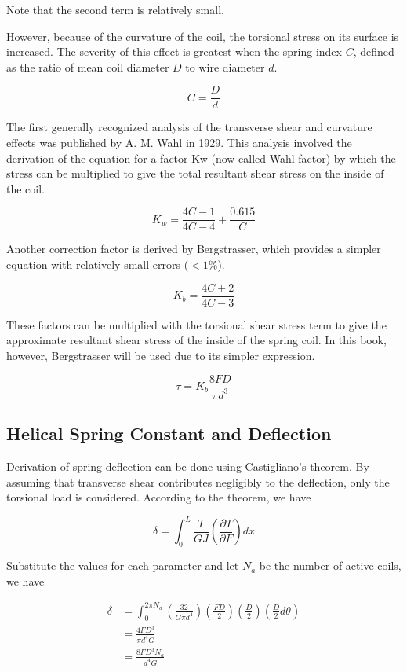 \documentclass[a4paper,openany,12pt]{book}
\begin{document}
{{Note that the second term is relatively small.

However, because of the curvature of the coil, the torsional stress on
its surface is increased. The severity of this effect is greatest when
the spring index \(C\), defined as the ratio of mean coil diameter \(D\) to
wire diameter \(d\).

$$C = \frac{D}{d}$$

The first generally recognized analysis of the transverse shear and
curvature effects was published by A. M. Wahl in 1929. This analysis
involved the derivation of the equation for a factor Kw (now called Wahl
factor) by which the stress can be multiplied to give the total
resultant shear stress on the inside of the coil.

$$K_w = \frac{4C - 1}{4C - 4} + \frac{0.615}{C}$$

Another correction factor is derived by Bergstrasser, which provides a
simpler equation with relatively small errors (\(< 1\%\)).

$$K_b = \frac{4C + 2}{4C - 3}$$

These factors can be multiplied with the torsional shear stress term to
give the approximate resultant shear stress of the inside of the spring
coil. In this book, however, Bergstrasser will be used due to its
simpler expression.

$$\tau  = K_b\frac{8FD}{\pi d^3}$$

\subsection{Helical Spring Constant and Deflection}
\label{helical-spring-constant-and-deflection}
Derivation of spring deflection can be done using Castigliano's theorem.
By assuming that transverse shear contributes negligibly to the
deflection, only the torsional load is considered. According to the
theorem, we have

$$\delta  = \int_0^L \frac{T}{GJ}\left( \frac{\partial T}{\partial F} \right)dx$$

Substitute the values for each parameter and let \(N_a\) be the number of
active coils, we have

$$\begin{aligned}
  \delta  &= \int_0^{2\pi N_a} \left( \frac{32}{G\pi d^4} \right)\left( \frac{FD}{2} \right)\left( \frac{D}{2} \right)\left( \frac{D}{2}d\theta  \right) \\ 
          &= \frac{4FD^3}{\pi d^4G} \\ 
          &= \frac{8FD^3N_a}{d^4G}\end{aligned}$$

}}
\end{document}
